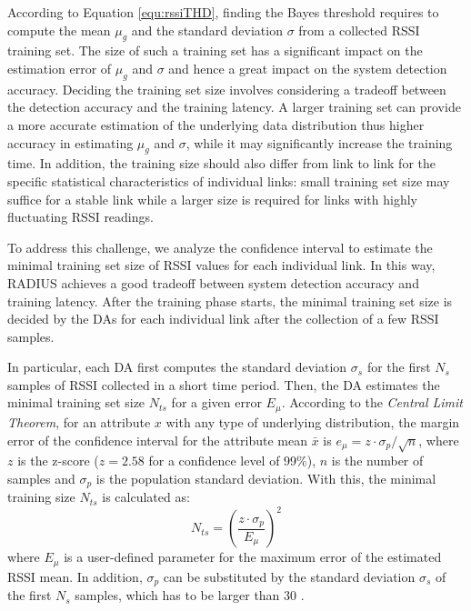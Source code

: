 According to Equation \ref{equ:rssiTHD}, finding the Bayes threshold requires to compute the mean $\mu_{g}$ and the standard deviation $\sigma$ from a collected RSSI training set. The size of such a training set has a significant impact on the estimation error of $\mu_{g}$ and $\sigma$ and hence a great impact on the system detection accuracy. Deciding the training set size involves considering a tradeoff between the detection accuracy and the training latency. A larger training set can provide a more accurate estimation of the underlying data distribution thus higher accuracy in estimating $\mu_{g}$ and $\sigma$, while it may significantly increase the training time. In addition, the training size should also differ from link to link for the specific statistical characteristics of individual links: small training set size may suffice for a stable link while a larger size is required for links with highly fluctuating RSSI readings. 

To address this challenge, we analyze the confidence interval to estimate the minimal training set size of RSSI values for each individual link. In this way, RADIUS achieves a good tradeoff between system detection accuracy and training latency. After the training phase starts, the minimal training set size is decided by the DAs for each individual link after the collection of a few RSSI samples.

In particular, each DA first computes the standard deviation $\sigma_s$ for the first $N_s$ samples of RSSI collected in a short time period. Then, the DA estimates the minimal training set size $N_{ts}$ for a given error $E_{\mu}$. According to the \textit{Central Limit Theorem}, for an attribute $x$ with any type of underlying distribution, the margin error of the confidence interval for the attribute mean $\bar{x}$ is  $e_{\mu} = z\cdot\sigma_p/\sqrt{n}$, where $z$ is the z-score ($z=2.58$ for a confidence level of 99\%), $n$ is the number of samples and $\sigma_p$ is the population standard deviation. With this, the minimal training size $N_{ts}$ is calculated as:
\begin{equation} \label{equ:minSampleSize}
{N_{ts}} = {\left(\frac{z\cdot \sigma_p }{E_{\mu}}\right)}^{2}
\end{equation} 
where $E_{\mu}$ is a user-defined parameter for the maximum error of the estimated RSSI mean. In addition,  $\sigma_p$ can be substituted by the standard deviation $\sigma_s$ of the first $ N_s$ samples, which has to be larger than 30 \cite{pitman1993probability}. 

